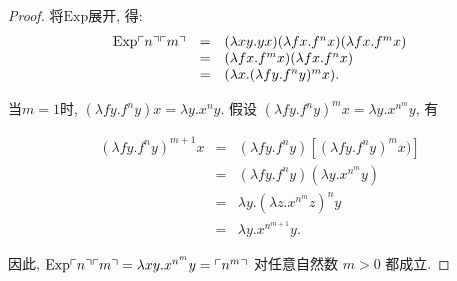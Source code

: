 \begin{proof}
    将$\mathrm{Exp}$展开, 得:
\[
\begin{array}{rcl}
 \mathrm{Exp} \ulcorner{n}\urcorner \ulcorner{m}\urcorner & = &
  (\lambda xy.yx) (\lambda fx.f^n x) (\lambda fx.f^m x) \\
 & = & (\lambda fx.f^m x) (\lambda fx.f^n x) \\
 & = & (\lambda x. (\lambda fy.f^n y)^m x). \\
\end{array}
\]

当$m=1$时, $(\lambda fy.f^ny) x = \lambda y. x^n y$.
假设
$(\lambda fy.f^ny)^m x = \lambda y. x^{n^m} y$, 有
 
\[
 \begin{array}{rcl}
 (\lambda fy.f^ny)^{m+1} x & = &
 (\lambda fy.f^ny) [ (\lambda fy.f^ny)^m x )] \\
 & =& (\lambda fy.f^ny)  (\lambda y.x^{n^m} y) \\
 & = & \lambda y. (\lambda z.x^{n^m} z)^n y \\
 & = & \lambda y. x^{n^{m+1}} y.
  \end{array}
\]

因此, $\mathrm{Exp} \ulcorner{n}\urcorner \ulcorner{m}\urcorner
= \lambda xy. x^{n^{m}}y=\ulcorner{n^m}\urcorner$ 对任意自然数 $m>0$ 都成立.
\end{proof}